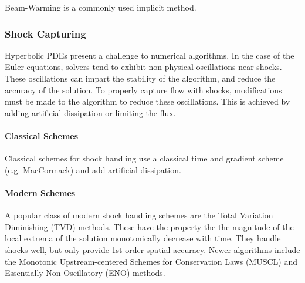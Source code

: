 \documentclass[paper=a4, fontsize=11pt]{scrartcl}
\numberwithin{equation}{section}        %
\numberwithin{figure}{section}          %
\numberwithin{table}{section}               %
\begin{document}
Beam-Warming is a commonly used implicit method.

\subsubsection{Shock Capturing}
Hyperbolic PDEs present a challenge to numerical algorithms. In the case of the Euler equations, solvers tend to exhibit non-physical oscillations near shocks. These oscillations can impart the stability of the algorithm, and reduce the accuracy of the solution. To properly capture flow with shocks, modifications must be made to the algorithm to reduce these oscillations. This is achieved by adding artificial dissipation or limiting the flux.\\

\paragraph{Classical Schemes}
Classical schemes for shock handling use a classical time and gradient scheme (e.g. MacCormack) and add artificial dissipation.

\paragraph{Modern Schemes}
A popular class of modern shock handling schemes are the Total Variation Diminishing (TVD) methods. These have the property the the magnitude of the local extrema of the solution monotonically decrease with time. They handle shocks well, but only provide 1st order spatial accuracy. Newer algorithms include the Monotonic Upstream-centered Schemes for Conservation Laws (MUSCL) and Essentially Non-Oscillatory (ENO) methods.
\end{document}
